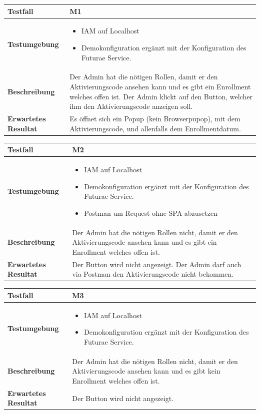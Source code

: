 	\begin{longtable}{p{}|p{}}
	\hline
	\textbf{Testfall}    			& M1 \\
	\hline
	\textbf{Testumgebung}	& 
	\begin{itemize}
		\item IAM auf Localhost 
		\item Demokonfiguration ergänzt mit der Konfiguration des Futurae Service.
	\end{itemize}\\
	\hline
	\textbf{Beschreibung}   		& Der Admin hat die nötigen Rollen, damit er den Aktivierungscode ansehen kann und es gibt ein Enrollment welches offen ist. Der Admin klickt auf den Button, welcher ihm den Aktivierungscode anzeigen soll. \\
	\hline
	\textbf{Erwartetes Resultat}	& Es öffnet sich ein Popup (kein Browserpupop), mit dem Aktivierungscode, und allenfalls dem Enrollmentdatum. \\
	\hline
	
\end{longtable} 
	\begin{longtable}{p{}|p{}}
	\hline
	\textbf{Testfall}    			& M2 \\
	\hline
	\textbf{Testumgebung}	& 
	\begin{itemize}
		\item IAM auf Localhost 
		\item Demokonfiguration ergänzt mit der Konfiguration des Futurae Service.
		\item Postman um Request ohne SPA abzusetzen
	\end{itemize}\\
	\hline
	\textbf{Beschreibung}   		& Der Admin hat die nötigen Rollen nicht, damit er den Aktivierungscode ansehen kann und es gibt ein Enrollment welches offen ist.\\
	\hline
	\textbf{Erwartetes Resultat}	& Der Button wird nicht angezeigt. Der Admin darf auch via Postman den Aktivierungscode nicht bekommen. \\
	\hline
	
\end{longtable} 
\newpage

\begin{longtable}{p{}|p{}}
\hline
\textbf{Testfall}    			& M3 \\
\hline
\textbf{Testumgebung}	& 
\begin{itemize}
	\item IAM auf Localhost 
	\item Demokonfiguration ergänzt mit der Konfiguration des Futurae Service.
\end{itemize}\\
\hline
\textbf{Beschreibung}   		& Der Admin hat die nötigen Rollen nicht, damit er den Aktivierungscode ansehen kann und es gibt kein Enrollment welches offen ist.\\
\hline
\textbf{Erwartetes Resultat}	& Der Button wird nicht angezeigt. \\
\hline

\end{longtable}  

